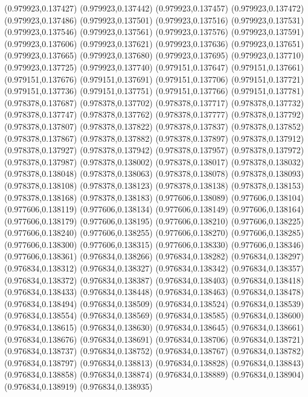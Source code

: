 (0.979923,0.137427)
(0.979923,0.137442)
(0.979923,0.137457)
(0.979923,0.137472)
(0.979923,0.137486)
(0.979923,0.137501)
(0.979923,0.137516)
(0.979923,0.137531)
(0.979923,0.137546)
(0.979923,0.137561)
(0.979923,0.137576)
(0.979923,0.137591)
(0.979923,0.137606)
(0.979923,0.137621)
(0.979923,0.137636)
(0.979923,0.137651)
(0.979923,0.137665)
(0.979923,0.137680)
(0.979923,0.137695)
(0.979923,0.137710)
(0.979923,0.137725)
(0.979923,0.137740)
(0.979151,0.137647)
(0.979151,0.137661)
(0.979151,0.137676)
(0.979151,0.137691)
(0.979151,0.137706)
(0.979151,0.137721)
(0.979151,0.137736)
(0.979151,0.137751)
(0.979151,0.137766)
(0.979151,0.137781)
(0.978378,0.137687)
(0.978378,0.137702)
(0.978378,0.137717)
(0.978378,0.137732)
(0.978378,0.137747)
(0.978378,0.137762)
(0.978378,0.137777)
(0.978378,0.137792)
(0.978378,0.137807)
(0.978378,0.137822)
(0.978378,0.137837)
(0.978378,0.137852)
(0.978378,0.137867)
(0.978378,0.137882)
(0.978378,0.137897)
(0.978378,0.137912)
(0.978378,0.137927)
(0.978378,0.137942)
(0.978378,0.137957)
(0.978378,0.137972)
(0.978378,0.137987)
(0.978378,0.138002)
(0.978378,0.138017)
(0.978378,0.138032)
(0.978378,0.138048)
(0.978378,0.138063)
(0.978378,0.138078)
(0.978378,0.138093)
(0.978378,0.138108)
(0.978378,0.138123)
(0.978378,0.138138)
(0.978378,0.138153)
(0.978378,0.138168)
(0.978378,0.138183)
(0.977606,0.138089)
(0.977606,0.138104)
(0.977606,0.138119)
(0.977606,0.138134)
(0.977606,0.138149)
(0.977606,0.138164)
(0.977606,0.138179)
(0.977606,0.138195)
(0.977606,0.138210)
(0.977606,0.138225)
(0.977606,0.138240)
(0.977606,0.138255)
(0.977606,0.138270)
(0.977606,0.138285)
(0.977606,0.138300)
(0.977606,0.138315)
(0.977606,0.138330)
(0.977606,0.138346)
(0.977606,0.138361)
(0.976834,0.138266)
(0.976834,0.138282)
(0.976834,0.138297)
(0.976834,0.138312)
(0.976834,0.138327)
(0.976834,0.138342)
(0.976834,0.138357)
(0.976834,0.138372)
(0.976834,0.138387)
(0.976834,0.138403)
(0.976834,0.138418)
(0.976834,0.138433)
(0.976834,0.138448)
(0.976834,0.138463)
(0.976834,0.138478)
(0.976834,0.138494)
(0.976834,0.138509)
(0.976834,0.138524)
(0.976834,0.138539)
(0.976834,0.138554)
(0.976834,0.138569)
(0.976834,0.138585)
(0.976834,0.138600)
(0.976834,0.138615)
(0.976834,0.138630)
(0.976834,0.138645)
(0.976834,0.138661)
(0.976834,0.138676)
(0.976834,0.138691)
(0.976834,0.138706)
(0.976834,0.138721)
(0.976834,0.138737)
(0.976834,0.138752)
(0.976834,0.138767)
(0.976834,0.138782)
(0.976834,0.138797)
(0.976834,0.138813)
(0.976834,0.138828)
(0.976834,0.138843)
(0.976834,0.138858)
(0.976834,0.138874)
(0.976834,0.138889)
(0.976834,0.138904)
(0.976834,0.138919)
(0.976834,0.138935)
